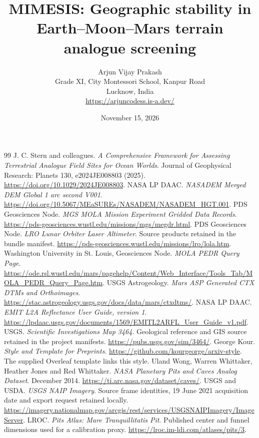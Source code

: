 \documentclass{article}
\title{MIMESIS: Geographic stability in Earth--Moon--Mars terrain analogue screening}
\author{Arjun Vijay Prakash\\
Grade XI, City Montessori School, Kanpur Road\\
Lucknow, India\\
\url{https://arjuncodess.is-a.dev/}}
\date{November 15, 2026}
\begin{document}
\maketitle


\begingroup\small
\begin{thebibliography}{99}
 J. C. Stern and colleagues. \emph{A Comprehensive Framework for Assessing Terrestrial Analogue Field Sites for Ocean Worlds}. Journal of Geophysical Research: Planets 130, e2024JE008803 (2025). \url{https://doi.org/10.1029/2024JE008803}.
 NASA LP DAAC. \emph{NASADEM Merged DEM Global 1 arc second V001}. \url{https://doi.org/10.5067/MEaSUREs/NASADEM/NASADEM_HGT.001}.
 PDS Geosciences Node. \emph{MGS MOLA Mission Experiment Gridded Data Records}. \url{https://pds-geosciences.wustl.edu/missions/mgs/megdr.html}.
 PDS Geosciences Node. \emph{LRO Lunar Orbiter Laser Altimeter}. Source products retained in the bundle manifest. \url{https://pds-geosciences.wustl.edu/missions/lro/lola.htm}.
 Washington University in St. Louis, Geosciences Node. \emph{MOLA PEDR Query Page}. \url{https://ode.rsl.wustl.edu/mars/pagehelp/Content/Web_Interface/Tools_Tab/MOLA_PEDR_Query_Page.htm}.
 USGS Astrogeology. \emph{Mars ASP Generated CTX DTMs and Orthoimages}. \url{https://stac.astrogeology.usgs.gov/docs/data/mars/ctxdtms/}.
 NASA LP DAAC. \emph{EMIT L2A Reflectance User Guide, version 1}. \url{https://lpdaac.usgs.gov/documents/1569/EMITL2ARFL_User_Guide_v1.pdf}.
 USGS. \emph{Scientific Investigations Map 3464}. Geological reference and GIS source retained in the project manifests. \url{https://pubs.usgs.gov/sim/3464/}.
 George Kour. \emph{Style and Template for Preprints}. \url{https://github.com/kourgeorge/arxiv-style}. The supplied Overleaf template links this style.
 Uland Wong, Warren Whittaker, Heather Jones and Red Whittaker. \emph{NASA Planetary Pits and Caves Analog Dataset}. December 2014. \url{https://ti.arc.nasa.gov/dataset/caves/}.
 USGS and USDA. \emph{USGS NAIP Imagery}. Source frame identities, 19 June 2021 acquisition date and export request retained locally. \url{https://imagery.nationalmap.gov/arcgis/rest/services/USGSNAIPImagery/ImageServer}.
 LROC. \emph{Pits Atlas: Mare Tranquillitatis Pit}. Published center and funnel dimensions used for a calibration proxy. \url{https://lroc.im-ldi.com/atlases/pits/3}.


\end{thebibliography}
\end{document}
